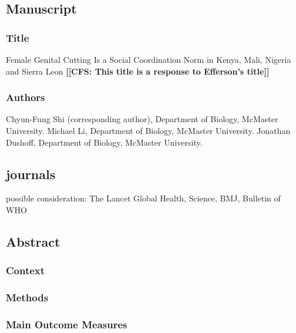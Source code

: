 \documentclass[12pt,]{article}
\date{}
\newcommand{\comment}[1]{\textbf{[[#1]]}}
\newcommand{\cfcmt}[1]{\comment{CFS: #1}}
\begin{document}
\subsection{Manuscript}\label{manuscript}

\subsubsection{Title}\label{title}

Female Genital Cutting Is a Social Coordination Norm in Kenya, Mali, Nigeria and Sierra Leon
\cfcmt{This title is a response to Efferson’s title}

\subsubsection{Authors}\label{authors}

Chyun-Fung Shi (corresponding author), Department of Biology, McMaster
University. Michael Li, Department of Biology, McMaster University.
Jonathan Dushoff, Department of Biology, McMaster
University.

\subsection{journals}\label{journals}
possible consideration:  The Lancet Global Health, Science, BMJ, Bulletin of WHO

\subsection{Abstract}\label{abstract}

\subsubsection{Context}\label{context}

\subsubsection{}\label{objective}

\subsubsection{Methods}\label{Methods}

\subsubsection{Main Outcome Measures}\label{main-outcome-measures}
\end{document}
